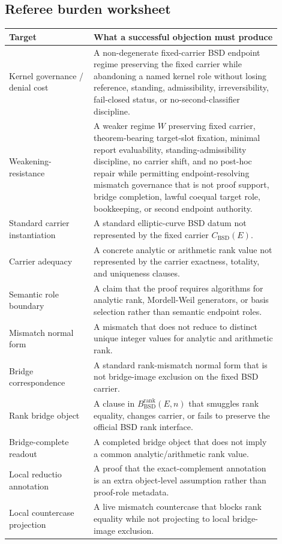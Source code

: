 \documentclass[11pt]{article}
\newcommand{\BSD}{\mathrm{BSD}}
\newcommand{\BsdRankBridge}{B^{\mathrm{rank}}_{\BSD}}
\begin{document}
\subsection{Referee burden worksheet}
\begin{longtable}{L{0.28\linewidth}L{0.62\linewidth}}
\toprule
\textbf{Target} & \textbf{What a successful objection must produce}\\
\midrule
Kernel governance / denial cost & A non-degenerate fixed-carrier BSD endpoint regime preserving the fixed carrier while abandoning a named kernel role without losing reference, standing, admissibility, irreversibility, fail-closed status, or no-second-classifier discipline.\\
Weakening-resistance & A weaker regime $W$ preserving fixed carrier, theorem-bearing target-slot fixation, minimal report evaluability, standing-admissibility discipline, no carrier shift, and no post-hoc repair while permitting endpoint-resolving mismatch governance that is not proof support, bridge completion, lawful coequal target role, bookkeeping, or second endpoint authority.\\
Standard carrier instantiation & A standard elliptic-curve BSD datum not represented by the fixed carrier $C_{\BSD}(E)$.\\
Carrier adequacy & A concrete analytic or arithmetic rank value not represented by the carrier exactness, totality, and uniqueness clauses.\\
Semantic role boundary & A claim that the proof requires algorithms for analytic rank, Mordell-Weil generators, or basis selection rather than semantic endpoint roles.\\
Mismatch normal form & A mismatch that does not reduce to distinct unique integer values for analytic and arithmetic rank.\\
Bridge correspondence & A standard rank-mismatch normal form that is not bridge-image exclusion on the fixed BSD carrier.\\
Rank bridge object & A clause in $\BsdRankBridge(E,n)$ that smuggles rank equality, changes carrier, or fails to preserve the official BSD rank interface.\\
Bridge-complete readout & A completed bridge object that does not imply a common analytic/arithmetic rank value.\\
Local reductio annotation & A proof that the exact-complement annotation is an extra object-level assumption rather than proof-role metadata.\\
Local countercase projection & A live mismatch countercase that blocks rank equality while not projecting to local bridge-image exclusion.\\

\end{longtable}
\end{document}
